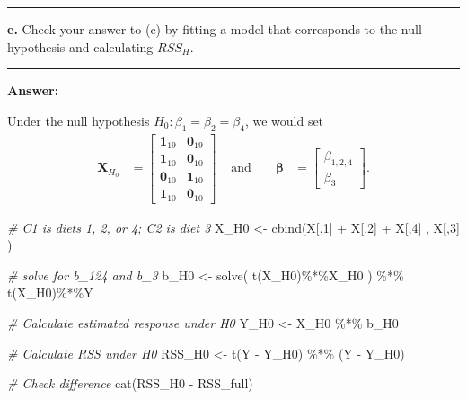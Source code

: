\documentclass[
]{article}
\newenvironment{Shaded}{\begin{snugshade}}{\end{snugshade}}
\newcommand{\CommentTok}[1]{\textcolor[rgb]{0.56,0.35,0.01}{\textit{#1}}}
\newcommand{\DecValTok}[1]{\textcolor[rgb]{0.00,0.00,0.81}{#1}}
\newcommand{\FunctionTok}[1]{\textcolor[rgb]{0.00,0.00,0.00}{#1}}
\newcommand{\NormalTok}[1]{#1}
\newcommand{\OtherTok}[1]{\textcolor[rgb]{0.56,0.35,0.01}{#1}}
\newcommand{\SpecialCharTok}[1]{\textcolor[rgb]{0.00,0.00,0.00}{#1}}
\newcommand{\bmX}{\ensuremath{\bm X}}
\newcommand{\bmbeta}{\ensuremath{\bm{\beta}}}
\begin{document}
\begin{center}\rule{0.5\linewidth}{0.5pt}\end{center}

\textbf{e.} Check your answer to (c) by fitting a model that corresponds
to the null hypothesis and calculating \(RSS_H\).

\begin{center}\rule{0.5\linewidth}{0.5pt}\end{center}

\textbf{Answer:}

Under the null hypothesis \(H_0: \beta_1 = \beta_2 = \beta_4\), we would
set \begin{align*}
\bmX_{H_0} &= 
\begin{bmatrix}
\bm1_{19} & \bm0_{19} \\
\bm1_{10} & \bm0_{10} \\
\bm0_{10} & \bm1_{10} \\
\bm1_{10} & \bm0_{10}
\end{bmatrix}
 & \text{ and } &&
\bmbeta &=
\begin{bmatrix}
\beta_{1,2,4} \\
\beta_3
\end{bmatrix}.
\end{align*}

\begin{Shaded}
\begin{Highlighting}[]
\CommentTok{\# C1 is diets 1, 2, or 4; C2 is diet 3}
\NormalTok{X\_H0 }\OtherTok{\textless{}{-}} \FunctionTok{cbind}\NormalTok{(X[,}\DecValTok{1}\NormalTok{] }\SpecialCharTok{+}\NormalTok{ X[,}\DecValTok{2}\NormalTok{] }\SpecialCharTok{+}\NormalTok{ X[,}\DecValTok{4}\NormalTok{]}
\NormalTok{              , X[,}\DecValTok{3}\NormalTok{]}
\NormalTok{              )}

\CommentTok{\# solve for b\_124 and b\_3}
\NormalTok{b\_H0 }\OtherTok{\textless{}{-}} \FunctionTok{solve}\NormalTok{( }\FunctionTok{t}\NormalTok{(X\_H0)}\SpecialCharTok{\%*\%}\NormalTok{X\_H0 ) }\SpecialCharTok{\%*\%} \FunctionTok{t}\NormalTok{(X\_H0)}\SpecialCharTok{\%*\%}\NormalTok{Y}

\CommentTok{\# Calculate estimated response under H0}
\NormalTok{Y\_H0 }\OtherTok{\textless{}{-}}\NormalTok{ X\_H0 }\SpecialCharTok{\%*\%}\NormalTok{ b\_H0}

\CommentTok{\# Calculate RSS under H0}
\NormalTok{RSS\_H0 }\OtherTok{\textless{}{-}} \FunctionTok{t}\NormalTok{(Y }\SpecialCharTok{{-}}\NormalTok{ Y\_H0) }\SpecialCharTok{\%*\%}\NormalTok{ (Y }\SpecialCharTok{{-}}\NormalTok{ Y\_H0)}

\CommentTok{\# Check difference}
\FunctionTok{cat}\NormalTok{(RSS\_H0 }\SpecialCharTok{{-}}\NormalTok{ RSS\_full)}
\end{Highlighting}
\end{Shaded}
\end{document}
